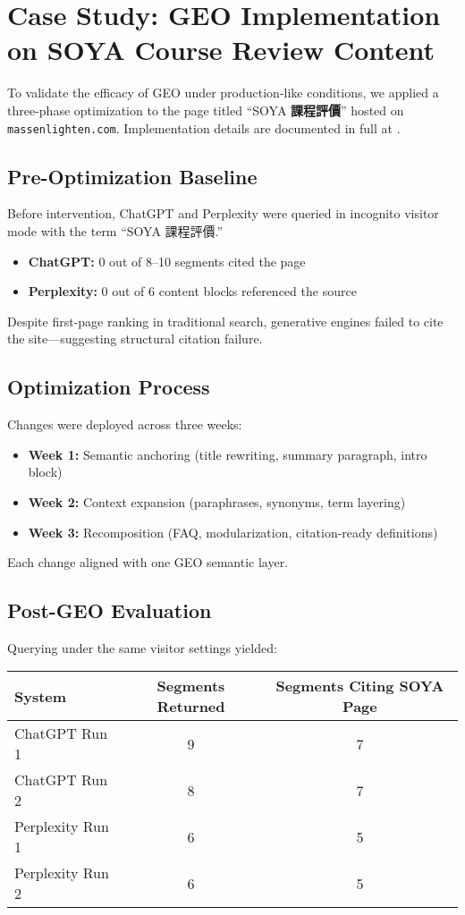 \section{Case Study: GEO Implementation on SOYA Course Review Content}

To validate the efficacy of GEO under production-like conditions, we applied a three-phase optimization to the page titled ``SOYA \textbf{課程評價}” hosted on \texttt{massenlighten.com}. Implementation details are documented in full at \cite{massenlighten2024blog}.

\subsection{Pre-Optimization Baseline}
Before intervention, ChatGPT and Perplexity were queried in incognito visitor mode with the term ``SOYA 課程評價.”
\begin{itemize}
  \item \textbf{ChatGPT:} 0 out of 8--10 segments cited the page
  \item \textbf{Perplexity:} 0 out of 6 content blocks referenced the source
\end{itemize}
Despite first-page ranking in traditional search, generative engines failed to cite the site---suggesting structural citation failure.

\subsection{Optimization Process}
Changes were deployed across three weeks:
\begin{itemize}
  \item \textbf{Week 1:} Semantic anchoring (title rewriting, summary paragraph, intro block)
  \item \textbf{Week 2:} Context expansion (paraphrases, synonyms, term layering)
  \item \textbf{Week 3:} Recomposition (FAQ, modularization, citation-ready definitions)
\end{itemize}
Each change aligned with one GEO semantic layer.

\subsection{Post-GEO Evaluation}
Querying under the same visitor settings yielded:
\begin{center}
\begin{tabular}{|l|c|c|}
\hline
\textbf{System} & \textbf{Segments Returned} & \textbf{Segments Citing SOYA Page} \\
\hline
ChatGPT Run 1 & 9 & 7 \\
ChatGPT Run 2 & 8 & 7 \\
Perplexity Run 1 & 6 & 5 \\
Perplexity Run 2 & 6 & 5 \\
\hline
\end{tabular}
\end{center}

